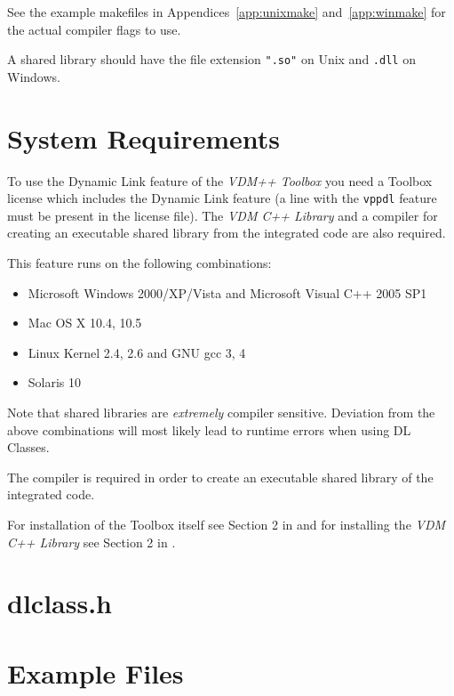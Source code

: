 \documentclass[\pformat,12pt]{article}
\begin{document}
See the example makefiles in Appendices~\ref{app:unixmake}
and~\ref{app:winmake} for the actual compiler flags to use.

A shared library should have the file extension {\tt ".so"} on Unix
and \texttt{.dll} on Windows. 

\newpage


\newpage
\appendix

\section{System Requirements}
\label{sec:sysreq}

To use the Dynamic Link feature of the {\it VDM++ Toolbox} you
need a Toolbox license which includes the Dynamic Link feature
(a line with the {\tt vppdl} feature must be present in the
license file). The {\it VDM  C++ Library} and a compiler for creating
an executable shared library from the integrated code are also required.

This feature runs on the following combinations:
\begin{itemize}
\item Microsoft Windows 2000/XP/Vista and Microsoft Visual C++ 2005 SP1
\item Mac OS X 10.4, 10.5
\item Linux Kernel 2.4, 2.6 and GNU gcc 3, 4
\item Solaris 10
\end{itemize}

Note that shared libraries are \textit{extremely} compiler
sensitive. Deviation from the above combinations will most likely lead
to runtime errors when using DL Classes.

The compiler is required in order to create an executable shared
library of the integrated code. 
 
For installation of the Toolbox itself see Section 2 in \cite{UserManPP-CSK}
and for installing the {\it VDM C++ Library} see Section 2 in \cite{CGManPP-CSK}.

\newpage
\section{dlclass.h}\label{app:dlclass_h}



\newpage
\section{Example Files}\label{app:interfacelayer}
\end{document}
